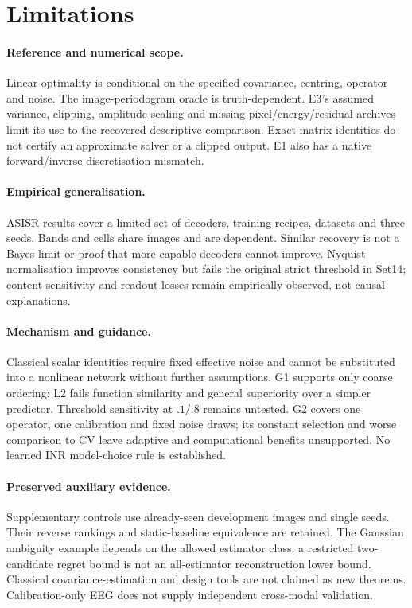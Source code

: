 \section{Limitations}\label{sec:limits}
\paragraph{Reference and numerical scope.} Linear optimality is conditional on the specified covariance, centring, operator and noise. The image-periodogram oracle is truth-dependent. E3's assumed variance, clipping, amplitude scaling and missing pixel/energy/residual archives limit its use to the recovered descriptive comparison. Exact matrix identities do not certify an approximate solver or a clipped output. E1 also has a native forward/inverse discretisation mismatch.

\paragraph{Empirical generalisation.} ASISR results cover a limited set of decoders, training recipes, datasets and three seeds. Bands and cells share images and are dependent. Similar recovery is not a Bayes limit or proof that more capable decoders cannot improve. Nyquist normalisation improves consistency but fails the original strict threshold in Set14; content sensitivity and readout losses remain empirically observed, not causal explanations.

\paragraph{Mechanism and guidance.} Classical scalar identities require fixed effective noise and cannot be substituted into a nonlinear network without further assumptions. G1 supports only coarse ordering; L2 fails function similarity and general superiority over a simpler predictor. Threshold sensitivity at $.1/.8$ remains untested. G2 covers one operator, one calibration and fixed noise draws; its constant selection and worse comparison to CV leave adaptive and computational benefits unsupported. No learned INR model-choice rule is established.

\paragraph{Preserved auxiliary evidence.} Supplementary controls use already-seen development images and single seeds. Their reverse rankings and static-baseline equivalence are retained. The Gaussian ambiguity example depends on the allowed estimator class; a restricted two-candidate regret bound is not an all-estimator reconstruction lower bound. Classical covariance-estimation and design tools are not claimed as new theorems. Calibration-only EEG does not supply independent cross-modal validation.

